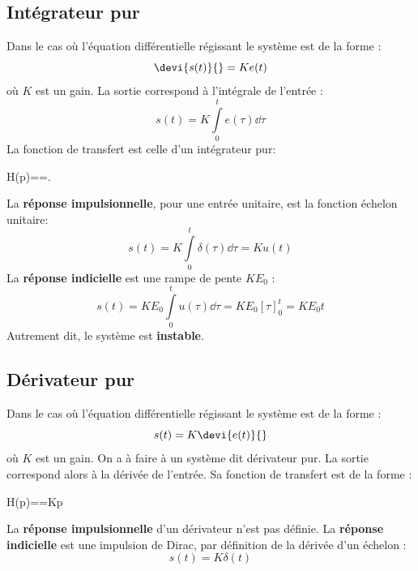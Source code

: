 \subsection{Intégrateur pur}
Dans le cas où l'équation différentielle régissant le système est de la forme :
\[
\devi{s(t)}{}=Ke(t)
\]
où $K$ est un gain. La sortie correspond à l'intégrale de l'entrée :
\[
s(t)=K\int\limits_0^t e(\tau)\dd{\tau}
\]
La fonction de transfert est celle d'un intégrateur pur:
\begin{bequation}
H(p)==.
\end{bequation}
La \textbf{réponse impulsionnelle}, pour une entrée unitaire, est la 
fonction échelon unitaire:
\[
s(t)=K\int\limits_0^t \delta(\tau)\dd{\tau}=Ku(t)
\]
La  \textbf{réponse indicielle} est une rampe de pente $KE_0$ :
\[
s(t)=KE_0\int\limits_0^t u(\tau)\dd{\tau}=KE_0\left[\tau\right]_0^t=KE_0t
\]
Autrement dit, le système est \textbf{instable}.
\subsection{Dérivateur pur}
Dans le cas où l'équation différentielle régissant le système est de la forme :
\[
s(t)=K\devi{e(t)}{}
\]
où $K$ est un gain. On a à faire à un système dit dérivateur pur. 
La sortie correspond alors à la dérivée de l'entrée.
Sa fonction de transfert est de la forme :
\begin{bequation}
H(p)==Kp
\end{bequation}
La \textbf{réponse impulsionnelle} d'un dérivateur n'est pas définie. 
La \textbf{réponse indicielle} est une impulsion de Dirac, par 
définition de la dérivée d'un échelon :
\[
s(t)=K\delta(t)
\]
